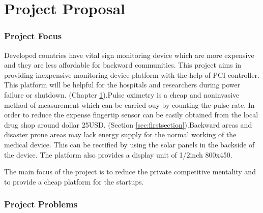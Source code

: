 
\chapter{Project Proposal}\label{chapter:firstchapter} %

\label{ChapterX} %







\subsection{Project Focus}


Developed countries have vital sign monitoring device which are more expensive and they are less affordable for backward communities. This project aims in providing inexpensive monitoring device platform with the help of PCI controller. This platform will be helpful for the hospitals and researchers during power failure or shutdown. (Chapter \ref{chapter:firstchapter}).Pulse oximetry is a cheap and noninvasive method of measurement which can be carried ouy by counting the pulse rate. In order to reduce the expense fingertip sensor can be easily obtained from the local drug shop around dollar 25USD. (Section \ref{sec:firstsection}).Backward areas and disaster prone areas may lack energy supply for the normal working of the medical device. This can be rectified by using the solar panels in the backside of the device. The platform also provides a display unit of 1/2inch 800x450.

The main focus of the project is to reduce the private competitive mentality and to provide a cheap platform for the startups.
 


\subsection{Project Problems}

